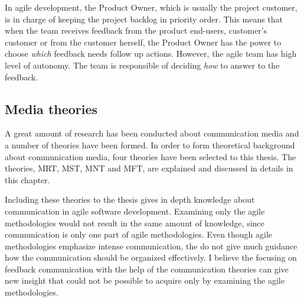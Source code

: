 \documentclass[english,12pt,a4paper,pdftex]{article}
\begin{document}
In agile development, the Product Owner, which is usually the project customer, is in charge of keeping the project backlog in priority order. This means that when the team receives feedback from the product end-users, customer's customer or from the customer herself, the Product Owner has the power to choose \emph{which} feedback needs follow up actions. However, the agile team has high level of autonomy. The team is responsible of deciding \emph{how} to answer to the feedback. 

\subsection{Media theories}

A great amount of research has been conducted about communication media and a number of theories have been formed. In order to form theoretical background about communication media, four theories have been selected to this thesis. The theories, \acl{MRT}, \acl{MST}, \acl{MNT} and \acl{MFT}, are explained and discussed in details in this chapter.

Including these theories to the thesis gives in depth knowledge about communication in agile software development. Examining only the agile methodologies would not result in the same amount of knowledge, since communication is only one part of agile methodologies. Even though agile methodologies emphasize intense communication, the do not give much guidance how the communication should be organized effectively. I believe the focusing on feedback communication with the help of the communication theories can give new insight that could not be possible to acquire only by examining the agile methodologies.
\end{document}
